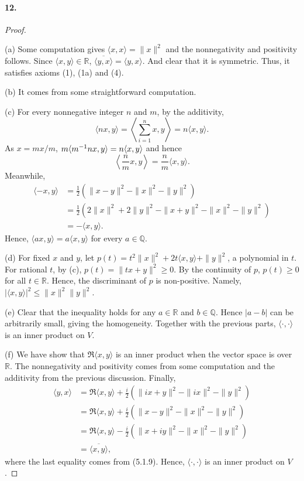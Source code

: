   \paragraph{12.}
  \begin{proof}
    $\,$\par
    (a) Some computation gives $\langle x,x\rangle=\|x\|^2$ and the 
    nonnegativity and positivity follows. Since $\langle x,y\rangle\in
    \mathbb{R}$, $\overline{\langle y,x\rangle}=\langle y,x\rangle$. And clear
    that it is symmetric. Thus, it satisfies axioms (1), (1a) and (4).\par
    (b) It comes from some straightforward computation.\par
    (c) For every nonnegative integer $n$ and $m$, by the additivity,
    \[
      \langle nx,y\rangle =\left\langle \sum_{i=1}^n x,y\right\rangle
      =n\langle x,y\rangle.
    \]
    As $x=mx/m$, $m\langle m^{-1} nx,y\rangle = n\langle x,y\rangle$ and hence
    \[
      \left\langle\frac{n}{m}x,y \right\rangle =
      \frac{n}{m}\langle x,y\rangle.
    \]
    Meanwhile,
    \begin{align*}
      \langle -x,y\rangle
      &=\frac{1}{2}(\|x-y\|^2-\|x\|^2-\|y\|^2)\\
      &=\frac{1}{2}(2\|x\|^2+2\|y\|^2-\|x+y\|^2-\|x\|^2-\|y\|^2) \\
      &= -\langle x,y\rangle.
    \end{align*}
    Hence, $\langle ax,y\rangle = a\langle x,y\rangle$ for every $a\in
    \mathbb{Q}$.\par
    (d) For fixed $x$ and $y$, let $p(t)=t^2\|x\|^2+2t\langle x,y\rangle+
    \|y\|^2$, a polynomial in $t$. For rational $t$, by (c), $p(t)=\|tx+y\|^2\ge
    0$. By the continuity of $p$, $p(t)\ge 0$ for all $t\in\mathbb{R}$. Hence,
    the discriminant of $p$ is non-positive. Namely, $|\langle x,y\rangle|^2 \le
    \|x\|^2\|y\|^2$.\par
    (e) Clear that the inequality holds for any $a\in\mathbb{R}$ and $b\in
    \mathbb{Q}$. Hence $|a-b|$ can be arbitrarily small, giving the homogeneity.
    Together with the previous parts, $\langle\cdot,\cdot\rangle$ is an inner 
    product on $V$.\par
    (f) We have show that $\Re\langle x,y\rangle$ is an inner product when the
    vector space is over $\mathbb{R}$. The nonnegativity and positivity comes 
    from some computation and the additivity from the previous discussion. 
    Finally,
    \begin{align*}
      \langle y,x\rangle 
      &= \Re\langle x,y\rangle + \frac{i}{2}(\|ix+y\|^2-\|ix\|^2-\|y\|^2)\\
      &= \Re\langle x,y\rangle + \frac{i}{2}(\|x-y\|^2-\|x\|^2-\|y\|^2)\\
      &= \Re\langle x,y\rangle - \frac{i}{2}(\|x+iy\|^2-\|x\|^2-\|y\|^2)\\
      &= \overline{\langle x,y\rangle},
    \end{align*}
    where the last equality comes from (5.1.9). Hence, $\langle\cdot,\cdot
    \rangle$ is an inner product on $V$.
  \end{proof}
